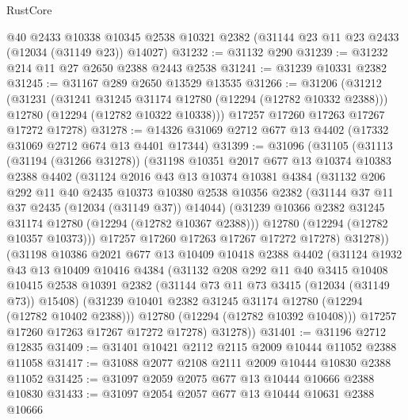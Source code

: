 \begin{lexlean}{RustCore}
\begin{coremodule}
    @40
    @2433
    @10338
    @10345
    @2538
    @10321
    @2382
    (@31144 @23 @11 @23 @2433 (@12034 (@31149 @23)) @14027)
@31232 := @31132 @290
@31239 := @31232 @214 @11 @27 @2650 @2388 @2443 @2538
@31241 := @31239 @10331 @2382
@31245 := @31167 @289 @2650 @13529 @13535
@31266 := @31206
    (@31212
      (@31231
        (@31241 @31245 @31174 @12780 (@12294 (@12782 @10332 @2388)))
        @12780
        (@12294 (@12782 @10322 @10338)))
      @17257
      @17260
      @17263
      @17267
      @17272
      @17278)
@31278 := @14326 @31069 @2712 @677 @13 @4402 (@17332 @31069 @2712 @674 @13 @4401 @17344)
@31399 := @31096
    (@31105
      (@31113
        (@31194 (@31266 @31278))
        (@31198
          @10351
          @2017
          @677
          @13
          @10374
          @10383
          @2388
          @4402
          (@31124
            @2016
            @43
            @13
            @10374
            @10381
            @4384
            (@31132
              @206
              @292
              @11
              @40
              @2435
              @10373
              @10380
              @2538
              @10356
              @2382
              (@31144 @37 @11 @37 @2435 (@12034 (@31149 @37)) @14044)
              (@31239 @10366 @2382 @31245 @31174 @12780 (@12294 (@12782 @10367 @2388)))
              @12780
              (@12294 (@12782 @10357 @10373)))
            @17257
            @17260
            @17263
            @17267
            @17272
            @17278)
          @31278))
      (@31198
        @10386
        @2021
        @677
        @13
        @10409
        @10418
        @2388
        @4402
        (@31124
          @1932
          @43
          @13
          @10409
          @10416
          @4384
          (@31132
            @208
            @292
            @11
            @40
            @3415
            @10408
            @10415
            @2538
            @10391
            @2382
            (@31144 @73 @11 @73 @3415 (@12034 (@31149 @73)) @15408)
            (@31239 @10401 @2382 @31245 @31174 @12780 (@12294 (@12782 @10402 @2388)))
            @12780
            (@12294 (@12782 @10392 @10408)))
          @17257
          @17260
          @17263
          @17267
          @17272
          @17278)
        @31278))
@31401 := @31196 @2712 @12835
@31409 := @31401 @10421 @2112 @2115 @2009 @10444 @11052 @2388 @11058
@31417 := @31088 @2077 @2108 @2111 @2009 @10444 @10830 @2388 @11052
@31425 := @31097 @2059 @2075 @677 @13 @10444 @10666 @2388 @10830
@31433 := @31097 @2054 @2057 @677 @13 @10444 @10631 @2388 @10666

\end{coremodule}
\end{lexlean}
